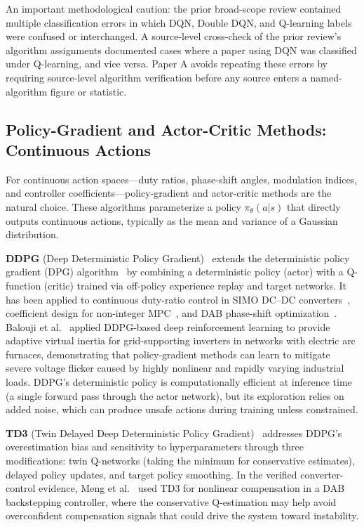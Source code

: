 \documentclass[manuscript,screen,review]{acmart}
\begin{document}
An important methodological caution: the prior broad-scope review contained multiple classification errors in which DQN, Double DQN, and Q-learning labels were confused or interchanged.
A source-level cross-check of the prior review's algorithm assignments documented cases where a paper using DQN was classified under Q-learning, and vice versa.
Paper A avoids repeating these errors by requiring source-level algorithm verification before any source enters a named-algorithm figure or statistic.

\subsection{Policy-Gradient and Actor-Critic Methods: Continuous Actions}

For continuous action spaces---duty ratios, phase-shift angles, modulation indices, and controller coefficients---policy-gradient and actor-critic methods are the natural choice.
These algorithms parameterize a policy $\pi_\theta(a|s)$ that directly outputs continuous actions, typically as the mean and variance of a Gaussian distribution.

\textbf{DDPG} (Deep Deterministic Policy Gradient)~\cite{lillicrap2016continuous} extends the deterministic policy gradient (DPG) algorithm~\cite{silver2014deterministic} by combining a deterministic policy (actor) with a Q-function (critic) trained via off-policy experience replay and target networks.
It has been applied to continuous duty-ratio control in SIMO DC--DC converters~\cite{ye2024deep}, coefficient design for non-integer MPC~\cite{khooban2022smartenance}, and DAB phase-shift optimization~\cite{tang2021deep}.
Balouji et al.~\cite{balouji2025deep} applied DDPG-based deep reinforcement learning to provide adaptive virtual inertia for grid-supporting inverters in networks with electric arc furnaces, demonstrating that policy-gradient methods can learn to mitigate severe voltage flicker caused by highly nonlinear and rapidly varying industrial loads.
DDPG's deterministic policy is computationally efficient at inference time (a single forward pass through the actor network), but its exploration relies on added noise, which can produce unsafe actions during training unless constrained.

\textbf{TD3} (Twin Delayed Deep Deterministic Policy Gradient)~\cite{fujimoto2018addressing} addresses DDPG's overestimation bias and sensitivity to hyperparameters through three modifications: twin Q-networks (taking the minimum for conservative estimates), delayed policy updates, and target policy smoothing.
In the verified converter-control evidence, Meng et al.~\cite{meng2022novel} used TD3 for nonlinear compensation in a DAB backstepping controller, where the conservative Q-estimation may help avoid overconfident compensation signals that could drive the system toward instability.
\end{document}
